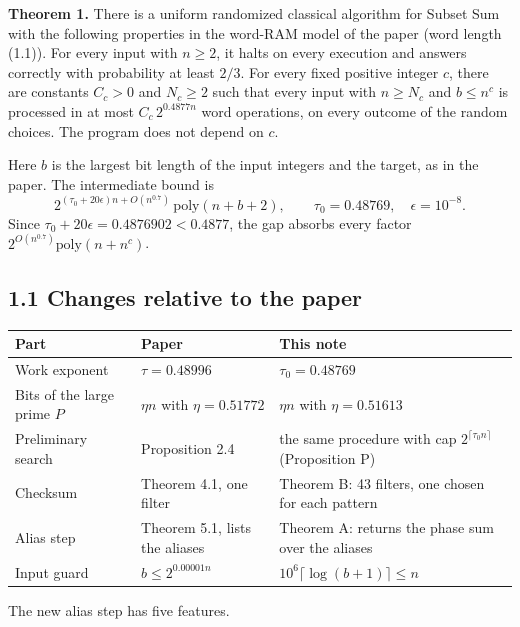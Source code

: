\documentclass[10pt,a4paper]{article}
\begin{document}
\textbf{Theorem 1.} There is a uniform randomized classical algorithm for Subset Sum with the following properties in the
word-RAM model of the paper (word length (1.1)). For every input with $n \ge 2$, it halts on every execution and
answers correctly with probability at least $2/3$. For every fixed positive integer $c$, there are constants $C_c > 0$
and $N_c \ge 2$ such that every input with $n \ge N_c$ and $b \le n^c$ is processed in at most $C_c\,2^{0.4877n}$
word operations, on every outcome of the random choices. The program does not depend on $c$.

Here $b$ is the largest bit length of the input integers and the target, as in the paper. The intermediate bound is
\[2^{(\tau_0 + 20\epsilon)n + O(n^{0.7})}\,\mathrm{poly}(n+b+2),\qquad \tau_0 = 0.48769,\quad \epsilon = 10^{-8}.\]
Since $\tau_0 + 20\epsilon = 0.4876902 < 0.4877$, the gap absorbs every factor $2^{O(n^{0.7})}\mathrm{poly}(n+n^c)$.

\subsection*{1.1 Changes relative to the paper}

{\small
\begin{longtable}{>{\raggedright\arraybackslash}p{0.223\dimexpr\linewidth-6\tabcolsep\relax}>{\raggedright\arraybackslash}p{0.268\dimexpr\linewidth-6\tabcolsep\relax}>{\raggedright\arraybackslash}p{0.509\dimexpr\linewidth-6\tabcolsep\relax}}
\hline
\textbf{Part} & \textbf{Paper} & \textbf{This note} \\ \hline
\endhead
Work exponent & $\tau = 0.48996$ & $\tau_0 = 0.48769$ \\
Bits of the large prime $P$ & $\eta n$ with $\eta = 0.51772$ & $\eta n$ with $\eta = 0.51613$ \\
Preliminary search & Proposition 2.4 & the same procedure with cap $2^{\lceil\tau_0 n\rceil}$ (Proposition P) \\
Checksum & Theorem 4.1, one filter & Theorem B: 43 filters, one chosen for each pattern \\
Alias step & Theorem 5.1, lists the aliases & Theorem A: returns the phase sum over the aliases \\
Input guard & $b \le 2^{0.00001n}$ & $10^6\lceil\log(b+1)\rceil \le n$ \\
\hline
\end{longtable}}

The new alias step has five features.
\end{document}
